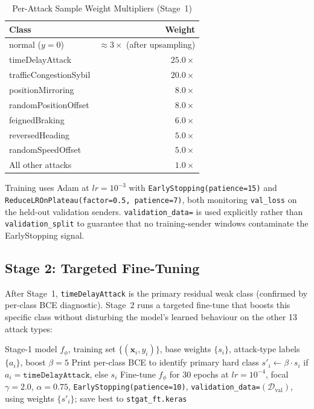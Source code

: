 \documentclass[conference]{IEEEtran}
\begin{document}
\begin{table}[t]
\centering
\caption{Per-Attack Sample Weight Multipliers (Stage~1)}
\label{tab:weights}
\setlength{\tabcolsep}{4pt}
\begin{tabular}{lr}
\toprule
\textbf{Class} & \textbf{Weight} \\
\midrule
normal ($y{=}0$)         & ${\approx}3\times$ (after upsampling) \\
timeDelayAttack          & $25.0\times$ \\
trafficCongestionSybil   & $20.0\times$ \\
positionMirroring        & $8.0\times$ \\
randomPositionOffset     & $8.0\times$ \\
feignedBraking           & $6.0\times$ \\
reversedHeading          & $5.0\times$ \\
randomSpeedOffset        & $5.0\times$ \\
All other attacks        & $1.0\times$ \\
\bottomrule
\end{tabular}
\end{table}

Training uses Adam at $lr=10^{-3}$ with
\texttt{EarlyStopping(patience=15)} and
\texttt{ReduceLROnPlateau(factor=0.5, patience=7)}, both monitoring
\texttt{val\_loss} on the held-out validation senders.
\texttt{validation\_data=} is used explicitly rather than
\texttt{validation\_split} to guarantee that no training-sender windows
contaminate the EarlyStopping signal.

\subsection{Stage 2: Targeted Fine-Tuning}

After Stage~1, \texttt{timeDelayAttack} is the primary residual weak
class (confirmed by per-class BCE diagnostic).  Stage~2 runs a targeted
fine-tune that boosts this specific class without disturbing the model's
learned behaviour on the other 13 attack types:

\begin{algorithm}
\caption{Targeted Fine-Tuning (Stage~2)}
\begin{algorithmic}[1]
\REQUIRE Stage-1 model $f_\phi$, training set $\{(\mathbf{x}_i, y_i)\}$,
         base weights $\{s_i\}$, attack-type labels $\{a_i\}$, boost $\beta=5$
\STATE Print per-class BCE to identify primary hard class
\STATE $s'_i \leftarrow \beta \cdot s_i$ if $a_i = \texttt{timeDelayAttack}$, else $s_i$
\STATE Fine-tune $f_\phi$ for 30 epochs at $lr=10^{-4}$,
       focal $\gamma=2.0$, $\alpha=0.75$,
       \texttt{EarlyStopping(patience=10)},
       \texttt{validation\_data=}$(\mathcal{D}_\text{val})$,
       using weights $\{s'_i\}$; save best to \texttt{stgat\_ft.keras}
\end{algorithmic}
\end{algorithm}
\end{document}
